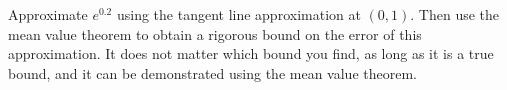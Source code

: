 \documentclass{ximera}
\author{Steven Gubkin}
\begin{document}
\begin{exercise}



Approximate $e^0.2$ using the tangent line approximation at $(0,1)$.  Then use the mean value theorem to obtain a rigorous bound on the error of this approximation.  It does not matter which bound you find, as long as it is a true bound, and it can be demonstrated using the mean value theorem.

\end{exercise}
\end{document}
